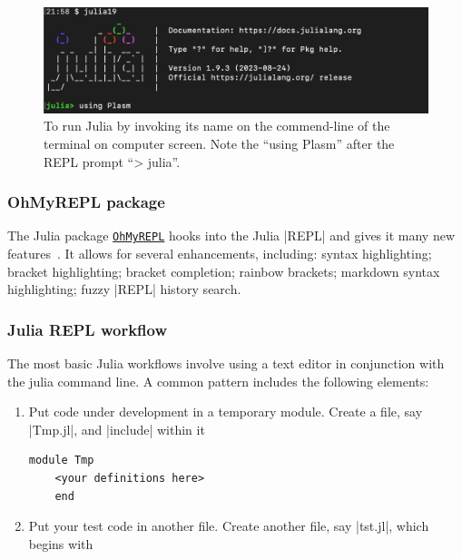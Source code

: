 \begin{script}
\begin{figure}
\centering
   \includegraphics[width=\textwidth]{chapter-02/figs/screen.pdf}%

\caption{To run Julia by invoking its name on the commend-line of the terminal on computer screen. Note the “using Plasm” after the REPL prompt “> julia”.}
\label{fig:2:ackplasm}
\end{figure}





\subsubsection*{OhMyREPL package}\label{sect:2-5-2}

The Julia package \href{https://kristofferc.github.io/OhMyREPL.jl/latest/}{\tt OhMyREPL} hooks into the Julia |REPL| and gives it many new features~\cite{OhMyREPL:jl}. It allows for several enhancements, including:
syntax highlighting; bracket highlighting; bracket completion; rainbow brackets;
markdown syntax highlighting; fuzzy |REPL| history search.



\subsubsection*{Julia REPL workflow}\label{sect:2-5-3}

The most basic Julia workflows involve using a text editor in conjunction with the julia command line. A common pattern includes the following elements:
\begin{enumerate}
 \item 
   Put code under development in a temporary module. Create a file, say |Tmp.jl|, and |include| within it

\begin{lstlisting}[language=JuliaLocal, style=julia, mathescape = true]
    module Tmp
    <your definitions here>
    end
\end{lstlisting}

\item 
    Put your test code in another file. Create another file, say |tst.jl|, which begins with


\end{enumerate}
\end{script}

